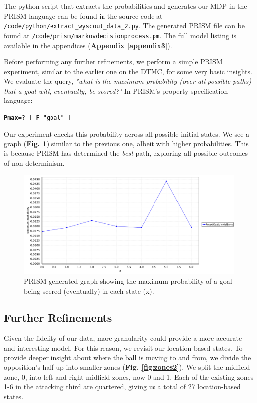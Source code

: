 \documentclass{l4proj}
\begin{document}
The python script that extracts the probabilities and generates our MDP in the PRISM language can be found in the source code at \texttt{/code/python/extract\_wyscout\_data\_2.py}. The generated PRISM file can be found at \texttt{/code/prism/markovdecisionprocess.pm}. The full model listing is available in the appendices (\textbf{Appendix \ref{appendix3}}).

Before performing any further refinements, we perform a simple PRISM experiment, similar to the earlier one on the DTMC, for some very basic insights. We evaluate the query, \textit{"what is the \textit{maximum} probability (over all possible paths) that a goal will, eventually, be scored?"} In PRISM's property specification language: 

\begin{center}
    \texttt{\textbf{Pmax}=? [ \textbf{F} "goal" ]}
\end{center}

Our experiment checks this probability across all possible initial states. We see a graph (\textbf{Fig. \ref{fig:sim2}}) similar to the previous one, albeit with higher probabilities. This is because PRISM has determined the \textit{best} path, exploring all possible outcomes of non-determinism.

\begin{figure}[h]
    \centering
    \includegraphics[scale=0.4]{images/prob_score2.png}   
    \caption{PRISM-generated graph showing the maximum probability of a goal being scored (eventually) in each state (x).}
    \label{fig:sim2} 
\end{figure}

\subsection{Further Refinements}

Given the fidelity of our data, more granularity could provide a more accurate and interesting model. For this reason, we revisit our location-based states. To provide deeper insight about where the ball is moving to and from, we divide the opposition's half up into smaller zones (\textbf{Fig. \ref{fig:zones2}}). We split the midfield zone, 0, into left and right midfield zones, now 0 and 1. Each of the existing zones 1-6 in the attacking third are quartered, giving us a total of 27 location-based states. 
\end{document}
